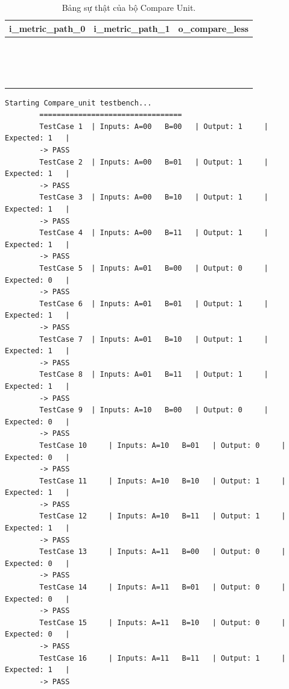 \begin{itemize}[label=-]
	\begin{table}[H]
		\centering
		\begin{tabular}{|>{\centering\arraybackslash}p{4cm}|>{\centering\arraybackslash}p{4cm}|>{\centering\arraybackslash}p{4cm}|}
			\hline
			\textbf{i\_metric\_path\_0} & \textbf{i\_metric\_path\_1} & \textbf{o\_compare\_less} \\
			\hline
			00 & 00 & 1 \\ \hline
			00 & 01 & 1 \\ \hline
			00 & 10 & 1 \\ \hline
			00 & 11 & 1 \\ \hline
			01 & 00 & 0 \\ \hline
			01 & 01 & 1 \\ \hline
			01 & 10 & 1 \\ \hline
			01 & 11 & 1 \\ \hline
			10 & 00 & 0 \\ \hline
			10 & 01 & 0 \\ \hline
			10 & 10 & 1 \\ \hline
			10 & 11 & 1 \\ \hline
			11 & 00 & 0 \\ \hline
			11 & 01 & 0 \\ \hline
			11 & 10 & 0 \\ \hline
			11 & 11 & 1 \\ \hline
			\hline
		\end{tabular}
		\caption{Bảng sự thật của bộ Compare Unit.}
	\end{table}
	
	\begin{lstlisting}[style=StyleResult, language=Result, caption={The Result of testing Compare Unit.}]
		Starting Compare_unit testbench...
		=================================
		TestCase 1 	| Inputs: A=00 	 B=00 	| Output: 1 	| Expected: 1 	| 
		-> PASS
		TestCase 2 	| Inputs: A=00 	 B=01 	| Output: 1 	| Expected: 1 	| 
		-> PASS
		TestCase 3 	| Inputs: A=00 	 B=10 	| Output: 1 	| Expected: 1 	| 
		-> PASS
		TestCase 4 	| Inputs: A=00 	 B=11 	| Output: 1 	| Expected: 1 	| 
		-> PASS
		TestCase 5 	| Inputs: A=01 	 B=00 	| Output: 0 	| Expected: 0 	| 
		-> PASS
		TestCase 6 	| Inputs: A=01 	 B=01 	| Output: 1 	| Expected: 1 	| 
		-> PASS
		TestCase 7 	| Inputs: A=01 	 B=10 	| Output: 1 	| Expected: 1 	| 
		-> PASS
		TestCase 8 	| Inputs: A=01 	 B=11 	| Output: 1 	| Expected: 1 	| 
		-> PASS
		TestCase 9 	| Inputs: A=10 	 B=00 	| Output: 0 	| Expected: 0 	| 
		-> PASS
		TestCase 10 	| Inputs: A=10 	 B=01 	| Output: 0 	| Expected: 0 	| 
		-> PASS
		TestCase 11 	| Inputs: A=10 	 B=10 	| Output: 1 	| Expected: 1 	| 
		-> PASS
		TestCase 12 	| Inputs: A=10 	 B=11 	| Output: 1 	| Expected: 1 	| 
		-> PASS
		TestCase 13 	| Inputs: A=11 	 B=00 	| Output: 0 	| Expected: 0 	| 
		-> PASS
		TestCase 14 	| Inputs: A=11 	 B=01 	| Output: 0 	| Expected: 0 	| 
		-> PASS
		TestCase 15 	| Inputs: A=11 	 B=10 	| Output: 0 	| Expected: 0 	| 
		-> PASS
		TestCase 16 	| Inputs: A=11 	 B=11 	| Output: 1 	| Expected: 1 	| 
		-> PASS
		

\end{lstlisting}
\end{itemize}
